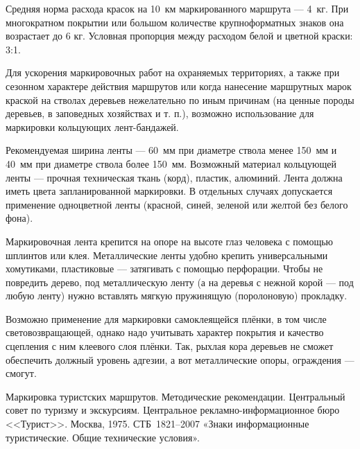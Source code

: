 \documentclass[a4paper,12pt]{extarticle}
\begin{document}
Средняя норма расхода красок на 10~км маркированного маршрута --- 4~кг. При многократном покрытии или большом количестве
крупноформатных знаков она возрастает до 6 кг. Условная пропорция между расходом белой и цветной краски: 3:1.

Для ускорения маркировочных работ на охраняемых территориях, а также при сезонном характере действия маршрутов или когда
нанесение маршрутных марок краской на стволах деревьев нежелательно по иным причинам (на ценные породы деревьев, в
заповедных хозяйствах и т. п.), возможно использование для маркировки кольцующих лент-бандажей.

Рекомендуемая ширина ленты --- 60~мм при диаметре ствола менее 150~мм и 40~мм при диаметре ствола более 150~мм. Возможный
материал кольцующей ленты --- прочная техническая ткань (корд), пластик, алюминий. Лента должна иметь цвета
запланированной маркировки. В отдельных случаях допускается применение одноцветной ленты (красной, синей, зеленой или
желтой без белого фона).

Маркировочная лента крепится на опоре на высоте глаз человека с помощью шплинтов или клея. Металлические ленты удобно
крепить универсальными хомутиками, пластиковые --- затягивать с помощью перфорации. Чтобы не
повредить дерево, под металлическую ленту (а на деревья с нежной корой --- под любую ленту) нужно вставлять мягкую
пружинящую (поролоновую) прокладку.

Возможно применение для маркировки самоклеящейся плёнки, в том числе световозвращающей, однако надо учитывать характер
покрытия и качество сцепления с ним клеевого слоя плёнки. Так, рыхлая кора деревьев не сможет обеспечить должный
уровень адгезии, а вот металлические опоры, ограждения --- смогут.


\begin{thebibliography}{99}
	 Маркировка туристских маршрутов. Методические рекомендации. Центральный совет по туризму и
		экскурсиям. Центральное рекламно-информационное бюро <<Турист>>. Москва, 1975.
	 СТБ~1821--2007 «Знаки информационные туристические. Общие технические условия».
\end{thebibliography}
\end{document}
